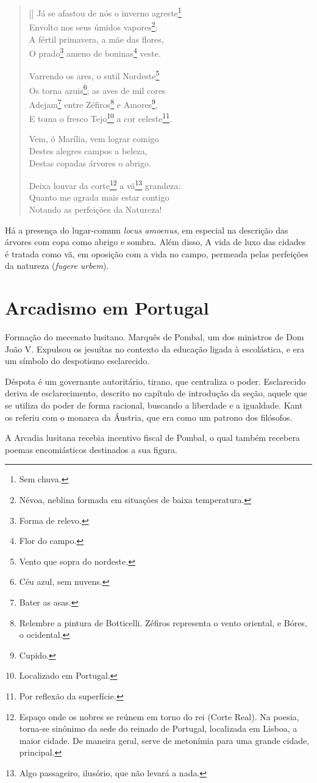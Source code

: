 \documentclass[12pt]{book}
\begin{document}
		\begin{verse}[\versewidth]
			Já se afastou de nós o inverno agreste\footnote{Sem chuva.} \\
			Envolto nos seus úmidos vapores\footnote{Névoa, neblina formada em situações de baixa temperatura.}; \\
			A fértil primavera, a mãe das flores, \\
			O prado\footnote{Forma de relevo.} ameno de boninas\footnote{Flor do campo.} veste.
			
			Varrendo os ares, o sutil Nordeste\footnote{Vento que sopra do nordeste.} \\
			Os torna azuis\footnote{Céu azul, sem nuvens.}; as aves de mil cores \\
			Adejam\footnote{Bater as asas.} entre Zéfiros\footnote{Relembre a pintura de Botticelli. Zéfiros representa o vento oriental, e Bóres, o ocidental.} e Amores\footnote{Cupido.}, \\
			E toma o fresco Tejo\footnote{Localizado em Portugal.} a cor celeste\footnote{Por reflexão da superfície.}.
			
			Vem, ó Marília, vem lograr comigo \\
			Destes alegres campos a beleza, \\
			Destas copadas árvores o abrigo.
			
			Deixa louvar da corte\footnote{Espaço onde os nobres se reúnem em torno do rei (Corte Real). Na poesia, torna-se sinônimo da sede do reinado de Portugal, localizada em Lisboa, a maior cidade. De maneira geral, serve de metonímia para uma grande cidade, principal.} a vã\footnote{Algo passageiro, ilusório, que não levará a nada.} grandeza: \\
			Quanto me agrada mais estar contigo \\
			Notando as perfeições da Natureza!
		\end{verse}
		\par Há a presença do lugar-comum \textit{locus amoenus}, em especial na descrição das árvores com copa como abrigo e sombra. Além disso, A vida de luxo das cidades é tratada como vã, em oposição com a vida no campo, permeada pelas perfeições da natureza (\textit{fugere urbem}).
		
		\chapter{Arcadismo em Portugal}
		\par Formação do mecenato lusitano. Marquês de Pombal, um dos ministros de Dom João V. Expulsou os jesuítas no contexto da educação ligada à escolástica, e era um símbolo do despotismo esclarecido.
		\par Déspota é um governante autoritário, tirano, que centraliza o poder. Esclarecido deriva de esclarecimento, descrito no capítulo de introdução da seção, aquele que se utiliza do poder de forma racional, buscando a liberdade e a igualdade. Kant os referiu com o monarca da Áustria, que era como um patrono dos filósofos.
		\par A Arcadia lusitana recebia incentivo fiscal de Pombal, o qual também recebera poemas encomiásticos destinados a sua figura.
\end{document}
